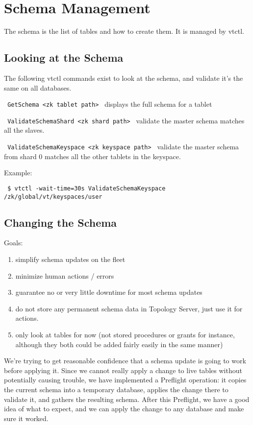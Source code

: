 \section{Schema Management}\label{Schema-Management}

The schema is the list of tables and how to create them. It is managed by vtctl.

\subsection{Looking at the Schema}\hypertarget{looking-at-the-schema}{}\label{looking-at-the-schema}

The following vtctl commands exist to look at the schema, and validate it's the same on all databases.

\texttt{ 
GetSchema \textless{}zk tablet path\textgreater{}
}
displays the full schema for a tablet

{\tt 
ValidateSchemaShard \textless{}zk shard path\textgreater{}
}
validate the master schema matches all the slaves.

{\tt 
ValidateSchemaKeyspace \textless{}zk keyspace path\textgreater{}
}
validate the master schema from shard 0 matches all the other tablets in the keyspace.

Example:

\texttt{
\$ vtctl -wait-time=30s ValidateSchemaKeyspace /zk/global/vt/keyspaces/user
}


\subsection{Changing the Schema}\hypertarget{changing-the-schema}{}\label{changing-the-schema}

Goals:
\begin{enumerate}
\item simplify schema updates on the fleet
\item minimize human actions / errors
\item guarantee no or very little downtime for most schema updates
\item do not store any permanent schema data in Topology Server, just use it for actions.
\item only look at tables for now (not stored procedures or grants for instance, although they both could be added fairly easily in the same manner)
\end{enumerate}

We’re trying to get reasonable confidence that a schema update is going to work before applying it. Since we cannot really apply a change to live tables without potentially causing trouble, we have implemented a Preflight operation: it copies the current schema into a temporary database, applies the change there to validate it, and gathers the resulting schema. After this Preflight, we have a good idea of what to expect, and we can apply the change to any database and make sure it worked.

